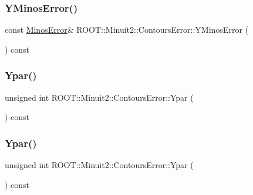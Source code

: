 \subsubsection{\texorpdfstring{YMinosError()}{YMinosError()}\hspace{0.1cm}{\footnotesize\ttfamily [3/3]}}
{\footnotesize\ttfamily const \mbox{\hyperlink{classROOT_1_1Minuit2_1_1MinosError}{Minos\+Error}}\& R\+O\+O\+T\+::\+Minuit2\+::\+Contours\+Error\+::\+Y\+Minos\+Error (\begin{DoxyParamCaption}{ }\end{DoxyParamCaption}) const\hspace{0.3cm}{\ttfamily [inline]}}

\mbox{\label{classROOT_1_1Minuit2_1_1ContoursError_a3d118d7b9c49e6835130e0ce50b94b18}} 
\subsubsection{\texorpdfstring{Ypar()}{Ypar()}\hspace{0.1cm}{\footnotesize\ttfamily [1/3]}}
{\footnotesize\ttfamily unsigned int R\+O\+O\+T\+::\+Minuit2\+::\+Contours\+Error\+::\+Ypar (\begin{DoxyParamCaption}{ }\end{DoxyParamCaption}) const\hspace{0.3cm}{\ttfamily [inline]}}

\mbox{\label{classROOT_1_1Minuit2_1_1ContoursError_a3d118d7b9c49e6835130e0ce50b94b18}} 
\subsubsection{\texorpdfstring{Ypar()}{Ypar()}\hspace{0.1cm}{\footnotesize\ttfamily [2/3]}}
{\footnotesize\ttfamily unsigned int R\+O\+O\+T\+::\+Minuit2\+::\+Contours\+Error\+::\+Ypar (\begin{DoxyParamCaption}{ }\end{DoxyParamCaption}) const\hspace{0.3cm}{\ttfamily [inline]}}

